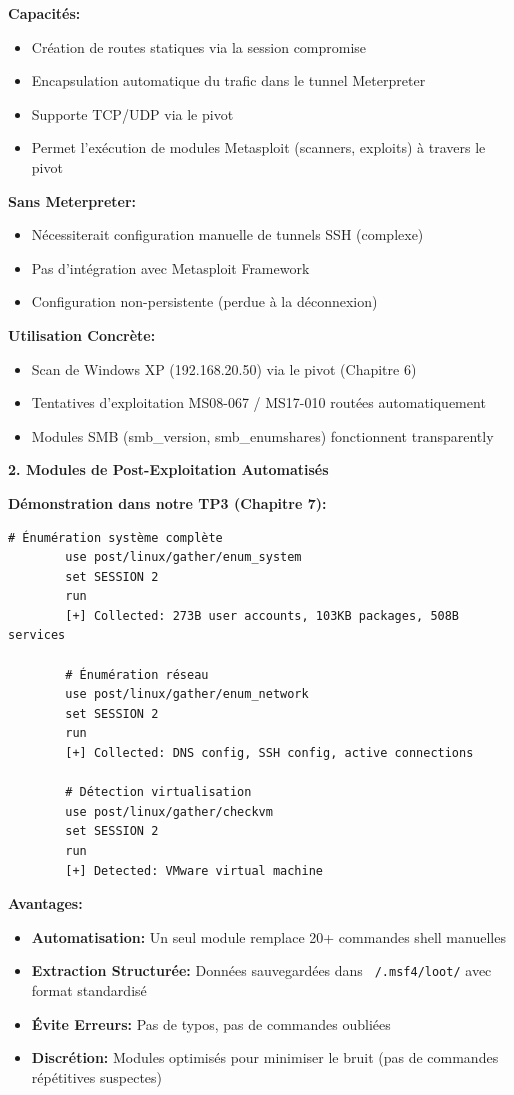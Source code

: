 \documentclass[12pt,a4paper,openany]{report}
\begin{document}
	\textbf{Capacités:}
	\begin{itemize}
		\item Création de routes statiques via la session compromise
		\item Encapsulation automatique du trafic dans le tunnel Meterpreter
		\item Supporte TCP/UDP via le pivot
		\item Permet l'exécution de modules Metasploit (scanners, exploits) 
		à travers le pivot
	\end{itemize}
	
	\textbf{Sans Meterpreter:}
	\begin{itemize}
		\item Nécessiterait configuration manuelle de tunnels SSH (complexe)
		\item Pas d'intégration avec Metasploit Framework
		\item Configuration non-persistente (perdue à la déconnexion)
	\end{itemize}
	
	\textbf{Utilisation Concrète:}
	\begin{itemize}
		\item Scan de Windows XP (192.168.20.50) via le pivot (Chapitre 6)
		\item Tentatives d'exploitation MS08-067 / MS17-010 routées automatiquement
		\item Modules SMB (smb\_version, smb\_enumshares) fonctionnent transparently
	\end{itemize}
	
	\textbf{2. Modules de Post-Exploitation Automatisés}
	
	\textbf{Démonstration dans notre TP3 (Chapitre 7):}
	
	\begin{lstlisting}[caption=Modules Post-Exploitation Utilisés]
		# Énumération système complète
		use post/linux/gather/enum_system
		set SESSION 2
		run
		[+] Collected: 273B user accounts, 103KB packages, 508B services
		
		# Énumération réseau
		use post/linux/gather/enum_network
		set SESSION 2
		run
		[+] Collected: DNS config, SSH config, active connections
		
		# Détection virtualisation
		use post/linux/gather/checkvm
		set SESSION 2
		run
		[+] Detected: VMware virtual machine
	\end{lstlisting}
	
	\textbf{Avantages:}
	\begin{itemize}
		\item \textbf{Automatisation:} Un seul module remplace 20+ commandes shell manuelles
		\item \textbf{Extraction Structurée:} Données sauvegardées dans \texttt{~/.msf4/loot/} 
		avec format standardisé
		\item \textbf{Évite Erreurs:} Pas de typos, pas de commandes oubliées
		\item \textbf{Discrétion:} Modules optimisés pour minimiser le bruit 
		(pas de commandes répétitives suspectes)
	\end{itemize}
	
\end{document}
